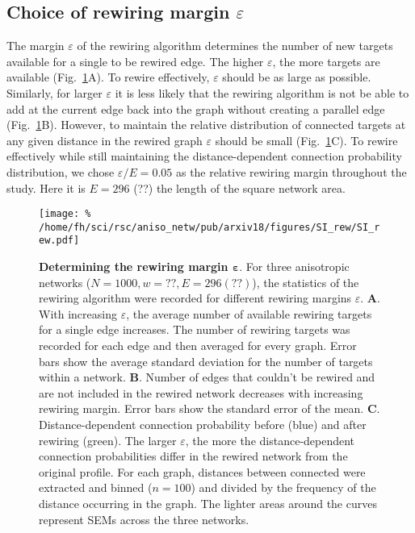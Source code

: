 
\subsection*{Choice of rewiring margin $\varepsilon$}

The margin $\varepsilon$ of the rewiring algorithm determines the number of new targets available for a single to be rewired edge. The higher $\varepsilon$, the more targets are available (Fig.~\ref{fig:rew-ddcp-ef}A). To rewire effectively, $\varepsilon$ should be as large as possible. Similarly, for larger $\varepsilon$ it is less likely that the rewiring algorithm is not be able to add at the current edge back into the graph without creating a parallel edge (Fig.~\ref{fig:rew-ddcp-ef}B). However, to maintain the relative distribution of connected targets at any given distance in the rewired graph $\varepsilon$ should be small (Fig.~\ref{fig:rew-ddcp-ef}C). To rewire effectively while still maintaining the distance-dependent connection probability distribution, we chose $\varepsilon/E = 0.05$ as the relative rewiring margin throughout the study. Here it is $E=296$ (??) the length of the square network area.


\begin{figure}[h!]
  \texttt{[image: \%
    /home/fh/sci/rsc/aniso\_netw/pub/arxiv18/figures/SI\_rew/SI\_rew.pdf]}
  \caption{\textbf{Determining the rewiring margin $\bm{\varepsilon}$}. For three anisotropic networks ($N=1000, w=??, E= 296 (??)$), the statistics of the rewiring algorithm were recorded for different rewiring margins $\varepsilon$.
    \textbf{A}. With increasing $\varepsilon$, the average number of available rewiring targets for a single edge increases. The number of rewiring targets was recorded for each edge and then averaged for every graph. Error bars show the average standard deviation for the number of targets within a network.
    \textbf{B}. Number of edges that couldn't be rewired and are not included in the rewired network decreases with increasing rewiring margin. Error bars show the standard error of the mean. \textbf{C}. Distance-dependent connection probability before (blue) and after rewiring (green). The larger $\varepsilon$, the more the distance-dependent connection probabilities differ in the rewired network from the original profile. For each graph, distances between connected were extracted and binned ($n=100$) and divided by the frequency of the distance occurring in the graph. The lighter areas around the curves represent SEMs across the three networks.}
  \label{fig:rew-ddcp-ef}
\end{figure}
